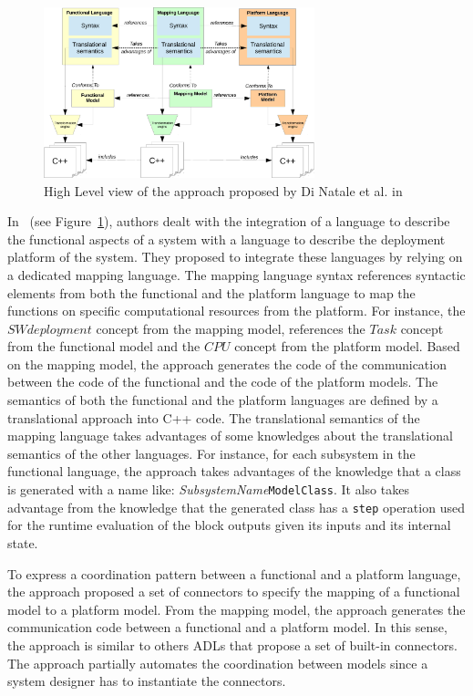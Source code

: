 \begin{figure}[ht!]
	\begin{center}
		\includegraphics[width=0.7\textwidth]{background/figs/diNatale}
		\caption{High Level view of the approach proposed by Di Natale et al. in~\cite{dinatale}}
		\label{fig:diNatale}
	\end{center}
\end{figure}

In~\cite{dinatale} (see Figure~\ref{fig:diNatale}), authors dealt with the integration of a language to describe the functional aspects of a system with a language to describe the deployment platform of the system. They proposed to integrate these languages by relying on a dedicated mapping language. The mapping language syntax references syntactic elements from both the functional and the platform language to map the functions on specific computational resources from the platform. For instance, the $SWdeployment$ concept from the mapping model, references the $Task$ concept from the functional model and the $CPU$ concept from the platform model. Based on the mapping model, the approach generates the code of the communication between the code of the functional and the code of the platform models. The semantics of both the functional and the platform languages are defined by a translational approach into C++ code. The translational semantics of the mapping language takes advantages of some knowledges about the translational semantics of the other languages. For instance, for each subsystem in the functional language, the approach takes advantages of the knowledge that a class is generated with a name like: \emph{SubsystemName}\texttt{ModelClass}. It also takes advantage from the knowledge that the generated class has a \texttt{step} operation used for the runtime evaluation of the block outputs given its inputs and its internal state. 

To express a coordination pattern between a functional and a platform language, the approach proposed a set of connectors to specify the mapping of a functional model to a platform model. From the mapping model, the approach generates the communication code between a functional and a platform model. In this sense, the approach is similar to others ADLs that propose a set of built-in connectors. The approach partially automates the coordination between models since a system designer has to instantiate the connectors.  

